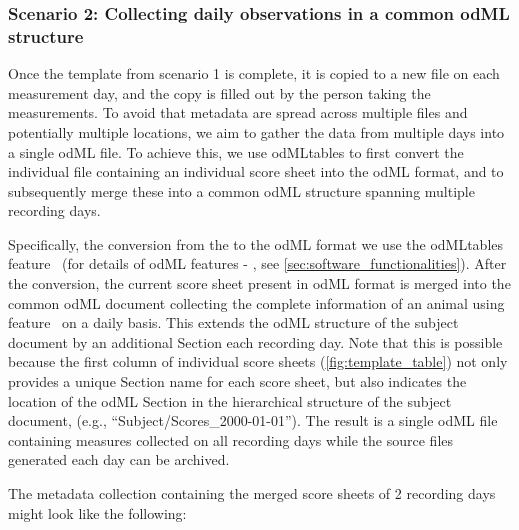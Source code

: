 \subsubsection*{Scenario 2: Collecting daily observations in a common odML structure}

Once the template from scenario 1 is complete, it is copied to a new file on each measurement day, and the copy is filled out by the person taking the measurements. To avoid that metadata are spread across multiple files and potentially multiple locations, we aim to gather the data from multiple days into a single odML file. To achieve this, we use odMLtables to first convert the individual  file containing an individual score sheet into the odML format, and to subsequently merge these into a common odML structure spanning multiple recording days.

Specifically, the conversion from the  to the odML format we use the odMLtables feature \fconvert\ (for details of odML features \fconvert - \ffilter, see \cref{sec:software_functionalities}). After the conversion, the current score sheet present in odML format is merged into the common odML document collecting the complete information of an animal using feature \fmerge \ on a daily basis. This extends the odML structure of the subject document by an additional Section each recording day. Note that this is possible because the first column of individual score sheets (\cref{fig:template_table}) not only provides a unique Section name for each score sheet, but also indicates the location of the odML Section in the hierarchical structure of the subject document, (e.g., ``Subject/Scores\_2000-01-01''). The result is a single odML file containing measures collected on all recording days while the source files generated each day can be archived.

The metadata collection containing the merged score sheets of 2 recording days might look like the following:

\begin{minipage}[t]{\textwidth}
\ \\
\end{minipage}

